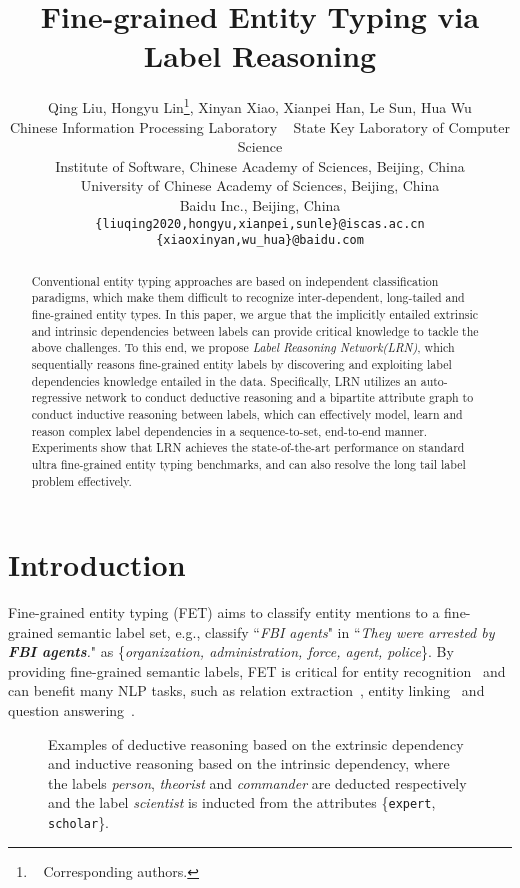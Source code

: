 \documentclass[11pt]{article}
\title{Fine-grained Entity Typing via Label Reasoning}
\author{
  Qing Liu,
  Hongyu Lin\thanks{~ Corresponding authors.},
  Xinyan Xiao,
  Xianpei Han\footnotemark[1],
  Le Sun,
  Hua Wu
  \\
  Chinese Information Processing Laboratory ~
  State Key Laboratory of Computer Science \\
  Institute of Software, Chinese Academy of Sciences, Beijing, China\\
  University of Chinese Academy of Sciences, Beijing, China \\
  Baidu Inc., Beijing, China \\
  {\tt \{liuqing2020,hongyu,xianpei,sunle\}@iscas.ac.cn} \\
 {\tt \{xiaoxinyan,wu\_hua\}@baidu.com}
}
\begin{document}
\maketitle
\begin{abstract}
Conventional entity typing approaches are based on independent classification paradigms, which make them difficult to recognize inter-dependent, long-tailed and fine-grained entity types. In this paper, we argue that the implicitly entailed extrinsic and intrinsic dependencies between labels can provide critical knowledge to tackle the above challenges. To this end, we propose \emph{Label Reasoning Network(LRN)}, which sequentially reasons fine-grained entity labels by discovering and exploiting label dependencies knowledge entailed in the data. Specifically, LRN utilizes an auto-regressive network to conduct deductive reasoning and a bipartite attribute graph to conduct inductive reasoning between labels, which can effectively model, learn and reason complex label dependencies in a sequence-to-set, end-to-end manner. Experiments show that LRN achieves the state-of-the-art performance on standard ultra fine-grained entity typing benchmarks, and can also resolve the long tail label problem effectively.

\end{abstract}
\section{Introduction}
Fine-grained entity typing (FET) aims to classify entity mentions to a fine-grained semantic label set, e.g., classify ``\textit{FBI agents}" in ``\textit{They were arrested by \textbf{FBI agents}.}" as \{\textit{organization, administration, force, agent, police}\}. By providing fine-grained semantic labels, FET is critical for entity recognition~\citep{DBLP:conf/acl/LinLHS19_icip1, DBLP:conf/emnlp/LinLHSDJ19_icip2, DBLP:conf/emnlp/LinLTHSWY20_icip3, DBLP:conf/aaai/ZhangLH0LWY21_icip4, zhang-etal-2021-de} and can benefit many NLP tasks, such as relation extraction~\cite{DBLP:conf/eacl/SchutzeYA17_RE_downstream1, DBLP:conf/acl/ZhangHLJSL19_RE_downstream2}, entity linking~\cite{DBLP:conf/aaai/OnoeD20_EL_downstream4} and question answering~\cite{DBLP:conf/emnlp/YavuzGSSY16_QA_downstream3}.
\begin{figure}[htb!]
\setlength{\belowcaptionskip}{-0.5cm}
\centering
	\caption{Examples of deductive reasoning based on the extrinsic dependency and inductive reasoning based on the intrinsic dependency, where the labels \textit{person}, \textit{theorist} and \textit{commander} are deducted respectively and the label \textit{scientist} is inducted from the attributes \{\texttt{expert}, \texttt{scholar}\}.}
	\label{Fig.introduction}
\end{figure}
\end{document}
